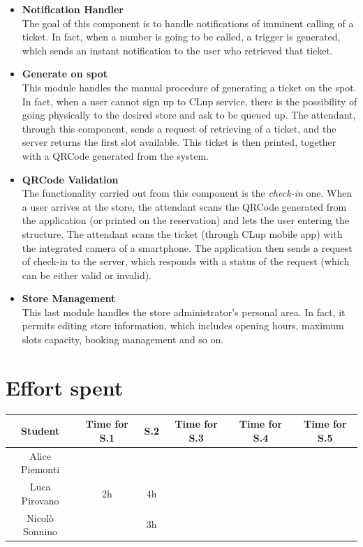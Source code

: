 \documentclass[table, 12pt]{article}
\begin{document}
\begin{itemize}
    \item \textbf{Notification Handler}\\The goal of this component is to handle notifications of imminent calling of a ticket. In fact, when a number is going to be called, a trigger is generated, which sends an instant notification to the user who retrieved that ticket.
    \item \textbf{Generate on spot}\\This module handles the manual procedure of generating a ticket on the spot. In fact, when a user cannot sign up to CLup service, there is the possibility of going physically to the desired store and ask to be queued up. The attendant, through this component, sends a request of retrieving of a ticket, and the server returns the first slot available. This ticket is then printed, together with a QRCode generated from the system.
    \item \textbf{QRCode Validation}\\The functionality carried out from this component is the \textit{check-in} one. When a user arrives at the store, the attendant scans the QRCode generated from the application (or printed on the reservation) and lets the user entering the structure. The attendant scans the ticket (through CLup mobile app) with the integrated camera of a smartphone. The application then sends a request of check-in to the server, which responds with a status of the request (which can be either valid or invalid).
    \item \textbf{Store Management}\\This last module handles the store administrator's personal area. In fact, it permits editing store information, which includes opening hours, maximum slots capacity, booking management and so on.
\end{itemize}
\pagestyle{plain}

\section{Effort spent}
\begin{tabular}{ | c || c | c | c | c| c|}
    \hline
    Student        & Time for S.1 & S.2 & Time for S.3 & Time for S.4 & Time for S.5 \\ \hline
    Alice Piemonti &              &     &              &              &              \\ \hline
    Luca Pirovano  & 2h           & 4h  &              &              &              \\ \hline
    Nicolò Sonnino &              & 3h  &              &              &              \\
    \hline
\end{tabular}
\end{document}
